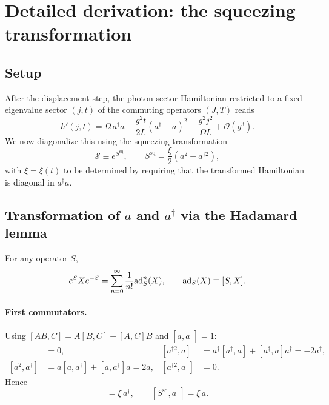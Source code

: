 \documentclass[../main.tex]{subfiles}
\begin{document}
\section{Detailed derivation: the squeezing transformation}
\label{sec:squeezing-transformation}

\subsection{Setup}

After the displacement step, the photon sector Hamiltonian restricted to a fixed
eigenvalue sector $(j,t)$ of the commuting operators $(J,T)$ reads
\begin{equation}
h'(j,t)=\Omega\,a^\dagger a-\frac{g^2t}{2L}(a^\dagger+a)^2-\frac{g^2j^2}{\Omega L}+\mathcal O(g^3).
\end{equation}
We now diagonalize this using the squeezing transformation
\begin{equation}
\mathcal S \equiv e^{S^{\mathrm{sq}}},\qquad S^{\mathrm{sq}}=\frac{\xi}{2}\left(a^2-a^{\dagger2}\right),
\end{equation}
with $\xi=\xi(t)$ to be determined by requiring that the transformed Hamiltonian is diagonal in $a^\dagger a$.

\subsection{Transformation of \texorpdfstring{$a$}{a} and \texorpdfstring{$a^\dagger$}{adag} via the Hadamard lemma}

For any operator $S$,
\begin{equation}
e^{S}Xe^{-S}=\sum_{n=0}^{\infty}\frac{1}{n!}\mathrm{ad}_S^n(X),\qquad \mathrm{ad}_S(X)\equiv[S,X].
\end{equation}

\paragraph{First commutators.}
Using $[AB,C]=A[B,C]+[A,C]B$ and $[a,a^\dagger]=1$:
\begin{align}
[a^2,a]&=0, & [a^{\dagger2},a]&=a^\dagger[a^\dagger,a]+[a^\dagger,a]a^\dagger=-2a^\dagger,\\
[a^2,a^\dagger]&=a[a,a^\dagger]+[a,a^\dagger]a=2a, & [a^{\dagger2},a^\dagger]&=0.
\end{align}
Hence
\begin{equation}
[S^{\mathrm{sq}},a]=\xi\,a^\dagger,
\qquad
[S^{\mathrm{sq}},a^\dagger]=\xi\,a.
\end{equation}
\end{document}
